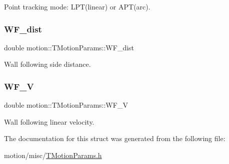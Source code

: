 Point tracking mode\+: L\+P\+T(linear) or A\+P\+T(arc). \mbox{\label{structmotion_1_1TMotionParams_a821918ccf43fc2a6980945a2f9806257}} 
\subsubsection{\texorpdfstring{W\+F\+\_\+dist}{WF\_dist}}
{\footnotesize\ttfamily double motion\+::\+T\+Motion\+Params\+::\+W\+F\+\_\+dist}

Wall following side distance. \mbox{\label{structmotion_1_1TMotionParams_ab9825758467d9ed3b06efeb705ad4572}} 
\subsubsection{\texorpdfstring{W\+F\+\_\+V}{WF\_V}}
{\footnotesize\ttfamily double motion\+::\+T\+Motion\+Params\+::\+W\+F\+\_\+V}

Wall following linear velocity. 

The documentation for this struct was generated from the following file\+:\begin{DoxyCompactItemize}
\item 
motion/misc/\mbox{\hyperlink{TMotionParams_8h}{T\+Motion\+Params.\+h}}\end{DoxyCompactItemize}

